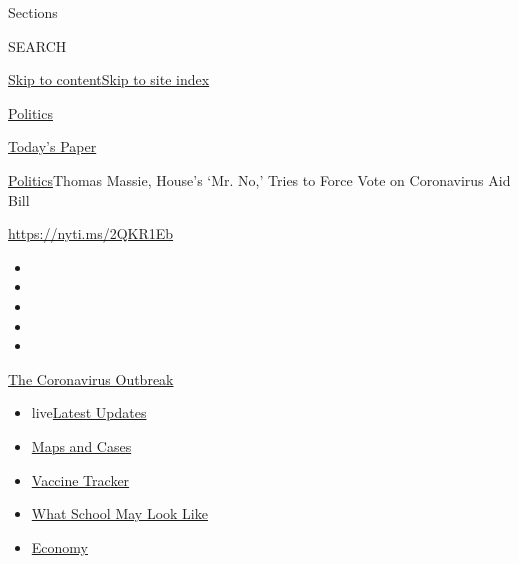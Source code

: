 Sections

SEARCH

\protect\hyperlink{site-content}{Skip to
content}\protect\hyperlink{site-index}{Skip to site index}

\href{https://www.nytimes.com/section/politics}{Politics}

\href{https://myaccount.nytimes.com/auth/login?response_type=cookie\&client_id=vi}{}

\href{https://www.nytimes.com/section/todayspaper}{Today's Paper}

\href{/section/politics}{Politics}\textbar{}Thomas Massie, House's `Mr.
No,' Tries to Force Vote on Coronavirus Aid Bill

\url{https://nyti.ms/2QKR1Eb}

\begin{itemize}
\item
\item
\item
\item
\item
\end{itemize}

\href{https://www.nytimes.com/news-event/coronavirus?action=click\&pgtype=Article\&state=default\&region=TOP_BANNER\&context=storylines_menu}{The
Coronavirus Outbreak}

\begin{itemize}
\tightlist
\item
  live\href{https://www.nytimes.com/2020/08/01/world/coronavirus-covid-19.html?action=click\&pgtype=Article\&state=default\&region=TOP_BANNER\&context=storylines_menu}{Latest
  Updates}
\item
  \href{https://www.nytimes.com/interactive/2020/us/coronavirus-us-cases.html?action=click\&pgtype=Article\&state=default\&region=TOP_BANNER\&context=storylines_menu}{Maps
  and Cases}
\item
  \href{https://www.nytimes.com/interactive/2020/science/coronavirus-vaccine-tracker.html?action=click\&pgtype=Article\&state=default\&region=TOP_BANNER\&context=storylines_menu}{Vaccine
  Tracker}
\item
  \href{https://www.nytimes.com/interactive/2020/07/29/us/schools-reopening-coronavirus.html?action=click\&pgtype=Article\&state=default\&region=TOP_BANNER\&context=storylines_menu}{What
  School May Look Like}
\item
  \href{https://www.nytimes.com/live/2020/07/31/business/stock-market-today-coronavirus?action=click\&pgtype=Article\&state=default\&region=TOP_BANNER\&context=storylines_menu}{Economy}
\end{itemize}

